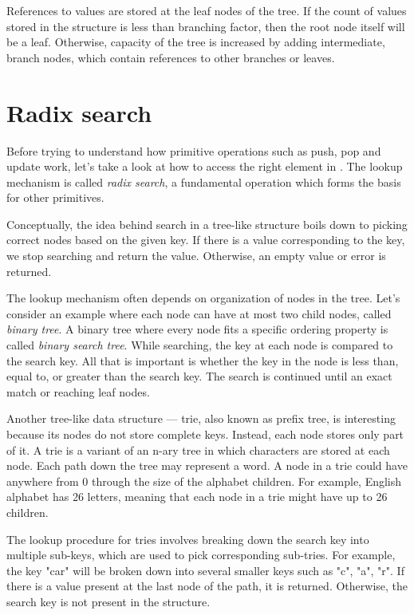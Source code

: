 References to values are stored at the leaf nodes of the tree. If the count of values stored in the structure is less than branching factor, then the root node itself will be a leaf. Otherwise, capacity of the tree is increased by adding intermediate, branch nodes, which contain references to other branches or leaves. 

\section{Radix search}

Before trying to understand how primitive operations such as push, pop and update work, let's take a look at how to access the right element in \rbtree{}. The lookup mechanism is called \emph{radix search}, a fundamental operation which forms the basis for other primitives.

Conceptually, the idea behind search in a tree-like structure boils down to picking correct nodes based on the given key. If there is a value corresponding to the key, we stop searching and return the value. Otherwise, an empty value or error is returned.

The lookup mechanism often depends on organization of nodes in the tree. Let's consider an example where each node can have at most two child nodes, called \emph{binary tree}. A binary tree where every node fits a specific ordering property is called \emph{binary search tree}. While searching, the key at each node is compared to the search key. All that is important is whether the key in the node is less than, equal to, or greater than the search key. The search is continued until an exact match or reaching leaf nodes.

Another tree-like data structure --- trie, also known as prefix tree, is interesting because its nodes do not store complete keys. Instead, each node stores only part of it. A trie is a variant of an n-ary tree in which characters are stored at each node. Each path down the tree may represent a word. A node in a trie could have anywhere from 0 through the size of the alphabet children. For example, English alphabet has 26 letters, meaning that each node in a trie might have up to 26 children.

The lookup procedure for tries involves breaking down the search key into multiple sub-keys, which are used to pick corresponding sub-tries. For example, the key "car" will be broken down into several smaller keys such as "c", "a", "r". If there is a value present at the last node of the path, it is returned. Otherwise, the search key is not present in the structure.

